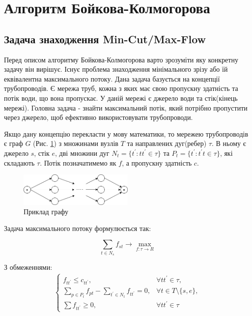 \section{Алгоритм Бойкова-Колмогорова}

\subsection{Задача знаходження Min-Cut/Max-Flow}

Перед описом алгоритму Бойкова-Колмогорова варто зрозуміти яку конкретну
задачу він вирішує. Існує проблема знаходження мінімального зрізу або їй
еквівалентна максимального потоку. Дана задача базується на концепції
трубопроводів. Є мережа труб, кожна з яких має свою пропускну здатність
та потік води, що вона пропускає. У даній мережі є джерело води та стік(кінець мережі).
Головна задача - знайти максимальний потік, який потрібно пропустити через джерело,
щоб ефективно використовувати трубопроводи.

Якщо дану концепцію перекласти у мову
математики, то мережею трубопроводів є граф $G$ (Рис. \ref{fig:graph_example})
з множинами вузлів $T$ та направлених дуг(ребер) $\tau$. В ньому є джерело $s$,
стік $e$, дві множини дуг $N_t = \{t^{'}: tt^{'} \in \tau \}$ та $P_t = \{t^{'}: t^{'}t \in \tau \}$,
які складають $\tau$. Потік позначатимемо як $f$, а пропускну здатність $c$.

\begin{figure}[H]
    \centering
    \includegraphics[width=0.5\textwidth]{images/graph_example}
    \caption{Приклад графу
        \label{fig:graph_example}
    }
\end{figure}

Задача максимального потоку формулюється так:

\begin{equation}
    \sum_{t \in N_s} f_{st} \rightarrow \max_{f: \tau \rightarrow R }
\end{equation}

З обмеженнями:
\begin{equation}
    \begin{gathered}
        \begin{cases}
            f_{tt^{'}} \leq  c_{tt^{'}},                                   & \forall tt^{'}  \in \tau ,         \\
            \sum_{p \in P_t} f_{pt} - \sum_{t^{'} \in N_t} f_{tt^{'}} = 0, & \forall t \in T \setminus \{s,e\}, \\
            \sum f_{tt^{'}} \geq 0,                                        & \forall tt^{'}  \in \tau
        \end{cases}
    \end{gathered}
\end{equation}

